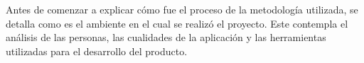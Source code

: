 Antes de comenzar a explicar cómo fue el proceso de la metodología utilizada, se detalla como es el ambiente en el cual se realizó el proyecto. Este contempla el análisis de las personas, las cualidades de la aplicación y las herramientas utilizadas para el desarrollo del producto.